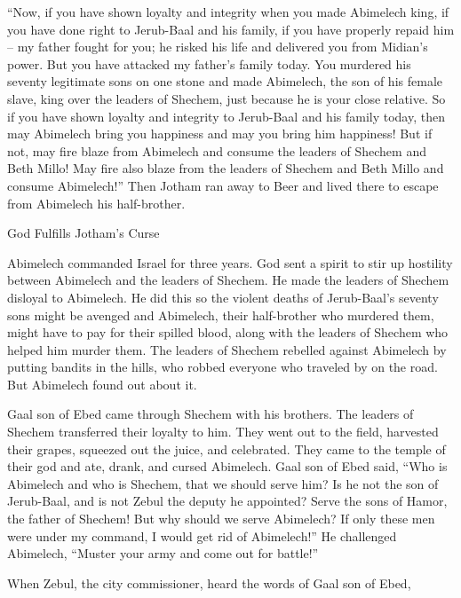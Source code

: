 {\par }{\PP {}“Now,
if
you have shown loyalty
and integrity
when you made
Abimelech
king,
if
you have done
right
to
Jerub-Baal
and his family,
if
you have properly repaid him –
my father
fought
for you; he risked
his life
and delivered
you from
Midian’s
power.
But you
have attacked
my father’s
family
today.
You murdered
his seventy
legitimate sons
on
one
stone
and made
Abimelech,
the son
of his female slave,
king over
the leaders
of Shechem,
just because
he is
your close relative.
So if
you have shown
loyalty
and integrity
to Jerub-Baal
and his family
today,
then may Abimelech
bring you happiness
and
may you bring him
happiness!
But if
not,
may fire
blaze from
Abimelech
and consume
the leaders
of Shechem
and Beth
Millo! May fire
also blaze from
the leaders
of Shechem
and Beth
Millo
and consume
Abimelech!”
Then Jotham
ran away
to Beer
and lived
there
to escape from
Abimelech
his half-brother.
\par }{\SH God Fulfills Jotham’s Curse
\par }{\PP {}Abimelech
commanded
Israel
for
three
years.
God
sent
a spirit
to stir up hostility
between
Abimelech
and the leaders
of Shechem.
He made the leaders
of Shechem
disloyal
to Abimelech.
He did this so the violent
deaths of Jerub-Baal’s
seventy
sons
might be avenged and Abimelech,
their half-brother
who
murdered
them, might have to pay
for their spilled blood,
along
with the leaders
of Shechem
who
helped
him murder
them.
The leaders
of Shechem
rebelled against
Abimelech by putting
bandits
in the hills,
who robbed
everyone
who
traveled
by on
the road.
But Abimelech
found out about it.
\par }{\PP {}Gaal
son
of Ebed
came
through
Shechem
with his brothers.
The leaders
of Shechem
transferred their loyalty to him.
They went out
to the field,
harvested
their grapes,
squeezed out
the juice, and celebrated.
They came
to the temple
of their god
and ate,
drank,
and cursed
Abimelech.
Gaal
son
of Ebed
said,
“Who
is Abimelech
and who
is Shechem,
that
we should serve
him? Is he not
the son
of Jerub-Baal,
and is not Zebul
the deputy
he appointed? Serve
the sons
of Hamor,
the father
of Shechem! But why
should we
serve Abimelech?
If only
these
men
were under my command,
I would get rid
of Abimelech!” He challenged
Abimelech, “Muster
your army
and come out
for battle!”
\par }{\PP {}When Zebul,
the city
commissioner,
heard
the words
of Gaal
son
of Ebed,
}
